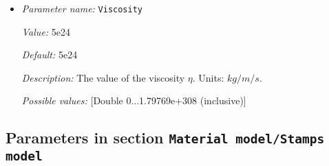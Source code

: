 \begin{itemize}
{\it Value:} 2e-5


{\it Default:} 2e-5


{\it Description:} The value of the thermal expansion coefficient $\beta$. Units: $1/K$.


{\it Possible values:} [Double 0...1.79769e+308 (inclusive)]
\item {\it Parameter name:} {\tt Viscosity}
\label{parameters:Material model/Simpler model/Viscosity}


{\it Value:} 5e24


{\it Default:} 5e24


{\it Description:} The value of the viscosity $\eta$. Units: $kg/m/s$.


{\it Possible values:} [Double 0...1.79769e+308 (inclusive)]
\end{itemize}

\subsection{Parameters in section \tt Material model/Stamps model}
\label{parameters:Material_20model/Stamps_20model}

